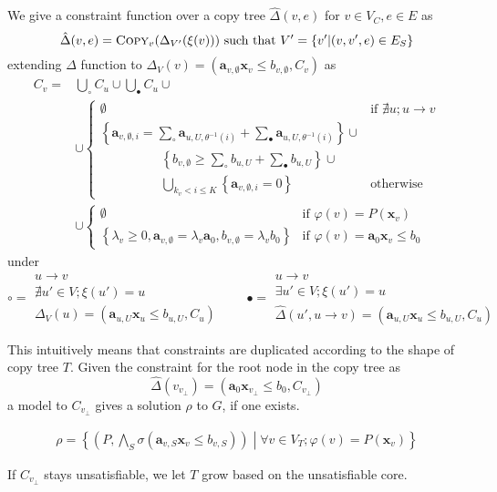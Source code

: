 \documentclass[a4paper,12pt]{article}
\begin{document}
We give a constraint function over a copy tree
$\hat \Delta(v,e)$ for $v \in V_C, e \in E$ as
\[ \hat \Delta (v,e) = \textsc{Copy}_v (\Delta_{V'} (\xi (v)))
\text{ such that } V' = \left\lbrace v' \middle| (v, v',e) \in E_S \right\rbrace \]
extending $\Delta$ function to
$\Delta_V (v) = (\mathbf{a}_{v,\emptyset} \mathbf{x}_v \leq b_{v,\emptyset}, C_v)$
as
\begin{align*}
C_v = & \bigcup_\circ C_u \cup \bigcup_\bullet C_u \cup
\\
& \cup \begin{cases}
\emptyset
& \mbox{if } \nexists u; u \rightarrow v \\
\left\lbrace
 \mathbf{a}_{v,\emptyset,i} =
  \sum_\circ \mathbf{a}_{u,U,\theta^{-1}(i)} +
  \sum_\bullet \mathbf{a}_{u,U, \theta^{-1}(i)}
\right\rbrace \cup \\
\hspace{2cm} \left\lbrace
 b_{v,\emptyset} \geq
  \sum_\circ b_{u,U} +
  \sum_\bullet b_{u,U}
\right\rbrace \cup \\
\hspace{2cm} \bigcup_{k_v < i \leq K} \left\lbrace \mathbf{a}_{v,\emptyset,i} = 0 \right\rbrace
& \mbox{otherwise}
\end{cases}
\\
& \cup \begin{cases}
\emptyset
& \mbox{if } \varphi(v) = P(\mathbf{x}_v) \\
\left\lbrace
 \lambda_v \geq 0, \mathbf{a}_{v,\emptyset} = \lambda_v \mathbf{a}_0,
 b_{v,\emptyset} = \lambda_v b_0
\right\rbrace
& \mbox{if } \varphi(v) = \mathbf{a}_0 \mathbf{x}_v \leq b_0
\end{cases}
\end{align*}
under
\[
\circ = \substack{
  u \rightarrow v \\
  \nexists u' \in V; \xi (u') = u \\
  \Delta_V (u) = (\mathbf{a}_{u,U} \mathbf{x}_u \leq b_{u,U}, C_u)}
\qquad \bullet = \substack{
  u \rightarrow v \\
  \exists u' \in V; \xi (u') = u \\
  \hat \Delta (u', u \rightarrow v) = (\mathbf{a}_{u,U} \mathbf{x}_u \leq b_{u,U}, C_u)} \]

This intuitively means that constraints are duplicated according to
the shape of copy tree $T$.
Given the constraint for the root node in the copy tree as
\[ \hat \Delta (v_{v_\bot}) = (\mathbf{a}_0 \mathbf{x}_{v_\bot} \leq b_0, C_{v_\bot}) \]
a model to $C_{v_\bot}$ gives a solution $\rho$ to $G$, if one exists.

\begin{align*}
 \rho = \left\lbrace
  \left( P, \bigwedge_S \sigma(\mathbf{a}_{v,S} \mathbf{x}_v \leq b_{v,S}) \right) \middle|
  \forall v \in V_T; \varphi(v) = P(\mathbf{x}_v)
 \right\rbrace
\end{align*}

If $C_{v_\bot}$ stays unsatisfiable, we let $T$ grow based on the
unsatisfiable core.
\end{document}
